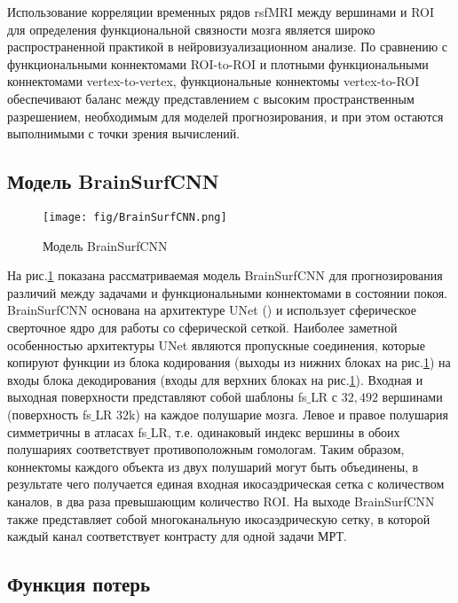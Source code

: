 Использование корреляции временных рядов rsfMRI между вершинами и ROI для определения функциональной связности мозга является широко распространенной практикой в нейровизуализационном анализе.
По сравнению с функциональными коннектомами ROI-to-ROI и плотными функциональными коннектомами vertex-to-vertex, функциональные коннектомы vertex-to-ROI обеспечивают баланс между представлением с высоким пространственным разрешением, необходимым для моделей прогнозирования, и при этом остаются выполнимыми с точки зрения вычислений.


\subsection{Модель BrainSurfCNN}

\begin{figure}
\centering
\texttt{[image: fig/BrainSurfCNN.png]}
\caption{\footnotesize {Модель BrainSurfCNN}}
\label{BrSurf}
\end{figure}

На рис.\ref{BrSurf} показана рассматриваемая модель BrainSurfCNN для прогнозирования различий между задачами и функциональными коннектомами в состоянии покоя.
BrainSurfCNN основана на архитектуре UNet (\cite{ronneberger2015u}) и использует сферическое сверточное ядро для работы со сферической сеткой.
Наиболее заметной особенностью архитектуры UNet являются пропускные соединения, которые копируют функции из блока кодирования (выходы из нижних блоках на рис.\ref{BrSurf}) на входы блока декодирования (входы для верхних блоках на рис.\ref{BrSurf}).
Входная и выходная поверхности представляют собой шаблоны fs$\_$LR с $32,492$ вершинами (поверхность fs$\_$LR $32$k) на каждое полушарие мозга.
Левое и правое полушария симметричны в атласах fs$\_$LR, т.е. одинаковый индекс вершины в обоих полушариях соответствует противоположным гомологам.
Таким образом, коннектомы каждого объекта из двух полушарий могут быть объединены, в результате чего получается единая входная икосаэдрическая сетка с количеством каналов, в два раза превышающим количество ROI.
На выходе BrainSurfCNN также представляет собой многоканальную икосаэдрическую сетку, в которой каждый канал соответствует контрасту для одной задачи МРТ.


\subsection{Функция потерь}

